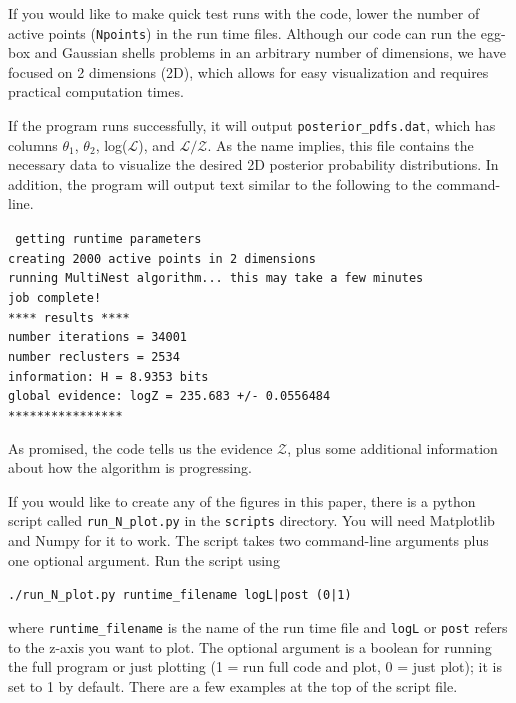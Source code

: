 \documentclass{article}
\begin{document}
\noindent If you would like to make quick test runs with the code, lower the number of active points ({\tt Npoints}) in the run time files. Although our code can run the egg-box and Gaussian shells problems in an arbitrary number of dimensions, we have focused on 2 dimensions (2D), which allows for easy visualization and requires practical computation times. 

If the program runs successfully, it will output {\tt posterior\_pdfs.dat}, which has columns  $\theta_1$, $\theta_2$, log($\mathcal{L}$), and $\mathcal{L/Z}$. As the name implies, this file contains the necessary data to visualize the desired 2D posterior probability distributions. In addition, the program will output text similar to the following to the command-line. 

\begin{adjustwidth*}{1.2cm}{1.2cm}
{\tt
getting runtime parameters\\
creating 2000 active points in 2 dimensions\\
running MultiNest algorithm... this may take a few minutes\\
job complete!\\
**** results ****\\
number iterations = 34001\\
number reclusters = 2534\\
information: H =  8.9353 bits\\
global evidence: logZ = 235.683 +/- 0.0556484\\
****************}
\end{adjustwidth*}

As promised, the code tells us the evidence $\mathcal{Z}$, plus some additional information about how the algorithm is progressing. 

If you would like to create any of the figures in this paper, there is a python script called {\tt run\_N\_plot.py} in the {\tt scripts} directory. You will need Matplotlib and Numpy for it to work. The script takes two command-line arguments plus one optional argument. Run the script using 

\vspace{0.2cm}

\begin{adjustwidth*}{2cm}{2cm}
{\tt ./run\_N\_plot.py runtime\_filename logL|post (0|1)}
\end{adjustwidth*}

\vspace{0.2cm}

\noindent where {\tt runtime\_filename} is the name of the run time file and {\tt logL} or {\tt post} refers to the z-axis you want to plot. The optional argument is a boolean for running the full program or just plotting (1 = run full code and plot, 0 = just plot); it is set to 1 by default. There are a few examples at the top of the script file. 

\vspace{-0.3cm}



\end{document}
